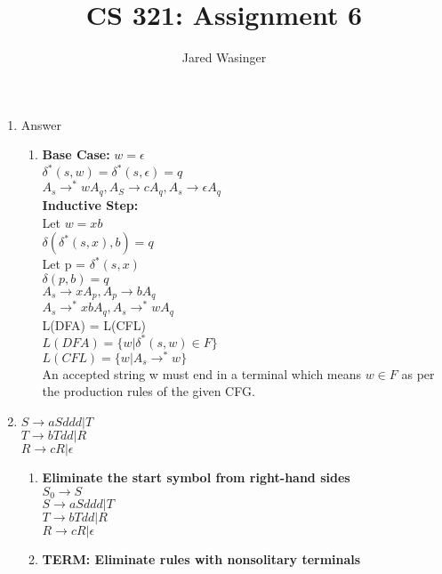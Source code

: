 \documentclass{article}
\begin{document}
  \title{CS 321: Assignment 6}
  \author{Jared Wasinger}

  \maketitle

	\begin{enumerate}
		\item Answer \begin{enumerate}
				\item \textbf{Base Case:} 
					$w = \epsilon$\\
					$\delta^*(s,w) = \delta^*(s, \epsilon) = q$\\
					$ A_s \rightarrow^* wA_q, A_S \rightarrow cA_q, A_s \rightarrow \epsilon A_q$\\

				\textbf{Inductive Step:}\\
					Let $w = xb$\\
					$\delta(\delta^*(s, x), b) = q$\\
					Let p = $\delta^*(s, x)$\\
					$\delta(p, b) = q$\\
					$A_s \rightarrow xA_p, A_p \rightarrow bA_q$\\
					$A_s \rightarrow^* xbA_q, A_s \rightarrow^* wA_q$\\

				L(DFA) = L(CFL)\\
					$L(DFA) = \{ w | \delta^*(s,w) \in F\}$\\
					$L(CFL) = \{ w | A_s \rightarrow^* w\}$\\
					An accepted string w must end in a terminal which means $w \in F$ as per the production rules of the given CFG.
			\end{enumerate}
		
		\item 
			$S \rightarrow aSddd | T$\\
			$T \rightarrow bTdd | R$\\
			$R \rightarrow cR | \epsilon$\\
			\begin{enumerate}
			\item \textbf{Eliminate the start symbol from right-hand sides}\\
				$S_0 \rightarrow S$\\
				$S \rightarrow aSddd | T$\\
				$T \rightarrow bTdd | R$\\
				$R \rightarrow cR | \epsilon$\\
			\item \textbf{TERM: Eliminate rules with nonsolitary terminals}\\
				

\end{enumerate}
\end{enumerate}
\end{document}
